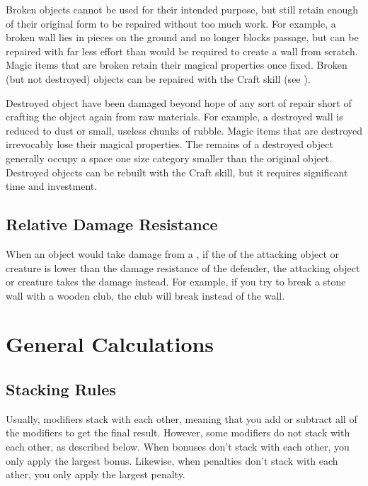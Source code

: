         \label{Broken Objects}
        Broken objects cannot be used for their intended purpose, but still retain enough of their original form to be repaired without too much work.
        For example, a broken wall lies in pieces on the ground and no longer blocks passage, but can be repaired with far less effort than would be required to create a wall from scratch.
        Magic items that are broken retain their magical properties once fixed.
        Broken (but not destroyed) objects can be repaired with the Craft skill (see ).

        \label{Destroyed Objects}
        Destroyed object have been damaged beyond hope of any sort of repair short of crafting the object again from raw materials.
        For example, a destroyed wall is reduced to dust or small, useless chunks of rubble.
        Magic items that are destroyed irrevocably lose their magical properties.
        The remains of a destroyed object generally occupy a space one size category smaller than the original object.
        Destroyed objects can be rebuilt with the Craft skill, but it requires significant time and investment.

    \subsection{Relative Damage Resistance}\label{Relative Damage Resistance}
        When an object would take damage from a , if the  of the attacking object or creature is lower than the damage resistance of the defender, the attacking object or creature takes the damage instead.
        For example, if you try to break a stone wall with a wooden club, the club will break instead of the wall.

\section{General Calculations}

    \subsection{Stacking Rules}\label{Stacking Rules}
        Usually, modifiers stack with each other, meaning that you add or subtract all of the modifiers to get the final result.
        However, some modifiers do not stack with each other, as described below.
        When bonuses don't stack with each other, you only apply the largest bonus.
        Likewise, when penalties don't stack with each ather, you only apply the largest penalty.

